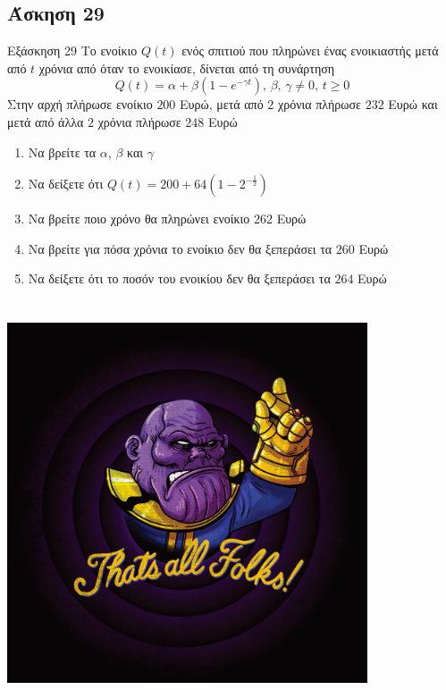 \documentclass[greek]{beamer}
\begin{document}
\subsection{Άσκηση 29}
\begin{frame}[label=Άσκηση29,t]{Εξάσκηση 29}
 Το ενοίκιο $Q(t)$ ενός σπιτιού που πληρώνει ένας ενοικιαστής μετά από $t$ χρόνια από όταν το ενοικίασε, δίνεται από τη συνάρτηση
 $$Q(t)=α+β(1-e^{-γt}) \text{, } β \text{, } γ\ne 0\text{, } t\ge 0$$
 Στην αρχή πλήρωσε ενοίκιο $200$ Ευρώ, μετά από $2$ χρόνια πλήρωσε $232$ Ευρώ και μετά από άλλα $2$ χρόνια πλήρωσε $248$ Ευρώ
 \begin{enumerate}
  \item<1-> Να βρείτε τα $α$, $β$ και $γ$
  \item<2-> Να δείξετε ότι $Q(t)=200+64\left( 1-2^{-\frac{1}{2}} \right) $
  \item<3-> Να βρείτε ποιο χρόνο θα πληρώνει ενοίκιο $262$ Ευρώ
  \item<4-> Να βρείτε για πόσα χρόνια το ενοίκιο δεν θα ξεπεράσει τα $260$ Ευρώ
  \item<5-> Να δείξετε ότι το ποσόν του ενοικίου δεν θα ξεπεράσει τα $264$ Ευρώ
 \end{enumerate}

\end{frame}

\appendix

\section{}
\begin{frame}
 \centering
 \includegraphics[width=0.8\textwidth]{"./images/thatsall.png"}

\end{frame}
\end{document}
